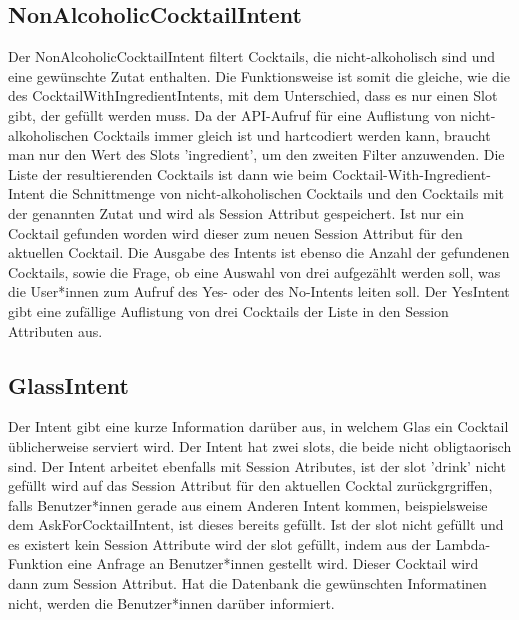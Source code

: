 \documentclass[12pt,letterpaper]{article}
\begin{document}
\subsection{NonAlcoholicCocktailIntent}
Der NonAlcoholicCocktailIntent filtert Cocktails, die nicht-alkoholisch sind und eine gewünschte Zutat enthalten. Die Funktionsweise ist somit die gleiche, wie die des CocktailWithIngredientIntents, mit dem Unterschied, dass es nur einen Slot gibt, der gefüllt werden muss. Da der API-Aufruf für eine Auflistung von nicht-alkoholischen Cocktails immer gleich ist und hartcodiert werden kann, braucht man nur den Wert des Slots 'ingredient', um den zweiten Filter anzuwenden. Die Liste der resultierenden Cocktails ist dann wie beim Cocktail-With-Ingredient-Intent die Schnittmenge von nicht-alkoholischen Cocktails und den Cocktails mit der genannten Zutat und wird als Session Attribut gespeichert. Ist nur ein Cocktail gefunden worden wird dieser zum neuen Session Attribut für den aktuellen Cocktail. Die Ausgabe des Intents ist ebenso die Anzahl der gefundenen Cocktails, sowie die Frage, ob eine Auswahl von drei aufgezählt werden soll, was die User*innen zum Aufruf des Yes- oder des No-Intents leiten soll. Der YesIntent gibt eine zufällige Auflistung von drei Cocktails der Liste in den Session Attributen aus. \\

\subsection{GlassIntent}
Der Intent gibt eine kurze Information darüber aus, in welchem Glas ein Cocktail üblicherweise serviert wird. Der Intent hat zwei slots, die beide nicht obligtaorisch sind. Der Intent arbeitet ebenfalls mit Session Atributes, ist der slot 'drink' nicht gefüllt wird auf das Session Attribut für den aktuellen Cocktal zurückgrgriffen, falls Benutzer*innen gerade aus einem Anderen Intent kommen, beispielsweise dem AskForCocktailIntent, ist dieses bereits gefüllt. Ist der slot nicht gefüllt und es existert kein Session Attribute wird der slot gefüllt, indem aus der Lambda-Funktion eine Anfrage an Benutzer*innen gestellt wird. Dieser Cocktail wird dann zum Session Attribut. Hat die Datenbank die gewünschten Informatinen nicht, werden die Benutzer*innen darüber informiert.
\end{document}
